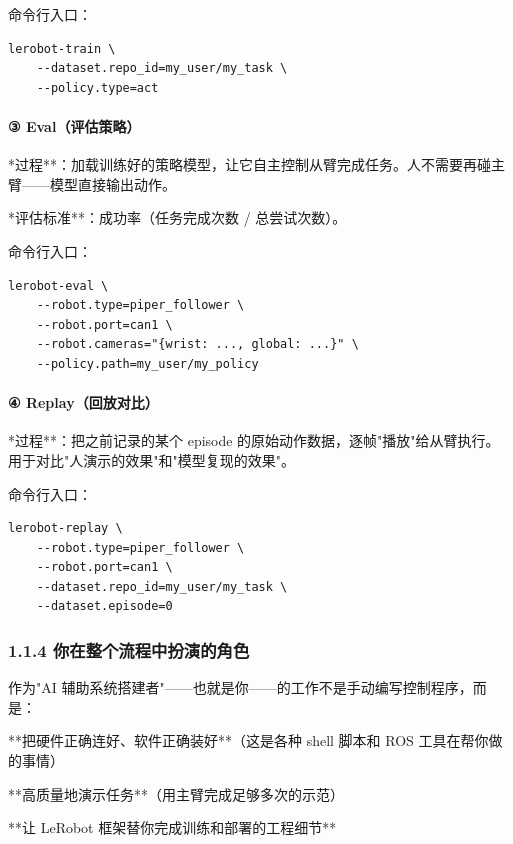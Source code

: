 \documentclass[UTF8,a4paper,11pt]{ctexart}
\begin{document}
命令行入口：

\begin{lstlisting}[language=shell]
lerobot-train \
    --dataset.repo_id=my_user/my_task \
    --policy.type=act
\end{lstlisting}

\paragraph{③ Eval（评估策略）}


\item **过程**：加载训练好的策略模型，让它自主控制从臂完成任务。人不需要再碰主臂——模型直接输出动作。
\item **评估标准**：成功率（任务完成次数 / 总尝试次数）。

命令行入口：

\begin{lstlisting}[language=shell]
lerobot-eval \
    --robot.type=piper_follower \
    --robot.port=can1 \
    --robot.cameras="{wrist: ..., global: ...}" \
    --policy.path=my_user/my_policy
\end{lstlisting}

\paragraph{④ Replay（回放对比）}


\item **过程**：把之前记录的某个 episode 的原始动作数据，逐帧"播放"给从臂执行。用于对比"人演示的效果"和"模型复现的效果"。

命令行入口：

\begin{lstlisting}[language=shell]
lerobot-replay \
    --robot.type=piper_follower \
    --robot.port=can1 \
    --dataset.repo_id=my_user/my_task \
    --dataset.episode=0
\end{lstlisting}

\subsubsection{1.1.4 你在整个流程中扮演的角色}

作为"AI 辅助系统搭建者"——也就是你——的工作不是手动编写控制程序，而是：

\item[1] **把硬件正确连好、软件正确装好**（这是各种 shell 脚本和 ROS 工具在帮你做的事情）
\item[2] **高质量地演示任务**（用主臂完成足够多次的示范）
\item[3] **让 LeRobot 框架替你完成训练和部署的工程细节**
\end{document}
